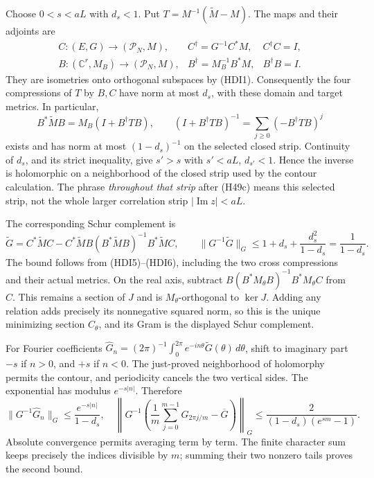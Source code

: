Choose \(0<s<aL\) with \(d_s<1\). Put
\(T=M^{-1}(\widetilde M-M)\). The maps and their adjoints are
\[
 \begin{array}{lll}
 C:(E,G)\to(\mathcal P_N,M),&
 C^\dagger=G^{-1}C^*M,&C^\dagger C=I,\\
 B:(\mathbb C^r,M_B)\to(\mathcal P_N,M),&
 B^\dagger=M_B^{-1}B^*M,&B^\dagger B=I.
 \end{array}
 \tag{HDI5}
\]
They are isometries onto orthogonal subspaces by (HDI1).
Consequently the four compressions of \(T\) by \(B,C\) have norm
at most \(d_s\), with these domain and target metrics. In particular,
\[
 B^*\widetilde M B=M_B(I+B^\dagger TB),\qquad
 (I+B^\dagger TB)^{-1}=\sum_{j\ge0}(-B^\dagger TB)^j
 \tag{HDI6}
\]
exists and has norm at most \((1-d_s)^{-1}\) on the selected
closed strip. Continuity of \(d_s\), and its strict inequality,
give \(s'>s\) with \(s'<aL\), \(d_{s'}<1\). Hence the inverse is
holomorphic on a neighborhood of the closed strip used by the
contour calculation. The phrase \emph{throughout that strip}
after (H49c) means this selected strip, not the whole larger
correlation strip \(|\operatorname{Im}z|<aL\).

The corresponding Schur complement is
\[
 \widetilde G=C^*\widetilde M C-
 C^*\widetilde M B(B^*\widetilde M B)^{-1}B^*\widetilde M C,
 \qquad
 \|G^{-1}\widetilde G\|_G
 \le1+d_s+\frac{d_s^2}{1-d_s}=\frac1{1-d_s}.
 \tag{HDI7}
\]
The bound follows from (HDI5)--(HDI6), including the two cross
compressions and their actual metrics. On the real axis, subtract
\(B(B^*M_\theta B)^{-1}B^*M_\theta C\) from \(C\). This remains
a section of \(J\) and is \(M_\theta\)-orthogonal to \(\ker J\).
Adding any relation adds precisely its nonnegative squared norm,
so this is the unique minimizing section \(C_\theta\), and its
Gram is the displayed Schur complement.

For Fourier coefficients
\(\widehat G_n=(2\pi)^{-1}\int_0^{2\pi}e^{-in\theta}
\widetilde G(\theta)\,d\theta\), shift to imaginary part \(-s\)
if \(n>0\), and \(+s\) if \(n<0\). The just-proved neighborhood
of holomorphy permits the contour, and periodicity cancels the
two vertical sides. The exponential has modulus \(e^{-s|n|}\).
Therefore
\[
 \|G^{-1}\widehat G_n\|_G\le\frac{e^{-s|n|}}{1-d_s},\quad
 \left\|G^{-1}\left(\frac1m\sum_{j=0}^{m-1}G_{2\pi j/m}
 -\overline G\right)\right\|_G
 \le\frac{2}{(1-d_s)(e^{sm}-1)}.
 \tag{HDI8}
\]
Absolute convergence permits averaging term by term.
The finite character sum keeps precisely the indices divisible
by \(m\); summing their two nonzero tails proves the second bound.

